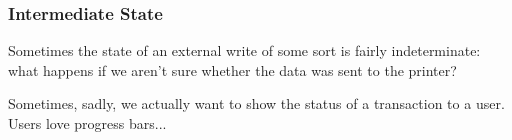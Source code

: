 \begin{frame}
\frametitle{Intermediate State}

Sometimes the state of an external write of some sort is fairly indeterminate: what happens if we aren't sure whether the data was sent to the printer?

Sometimes, sadly, we actually want to show the status of a transaction to a user. Users love progress bars...

\end{frame}









